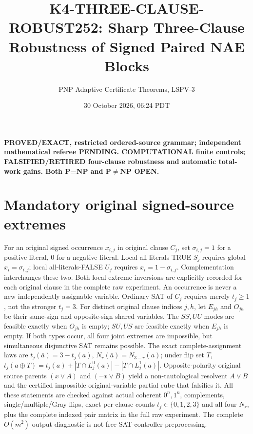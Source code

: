 \documentclass[10pt]{article}
\title{K4-THREE-CLAUSE-ROBUST252: Sharp Three-Clause Robustness of Signed Paired NAE Blocks}
\author{PNP Adaptive Certificate Theorems, LSPV-3}
\date{30 October 2026, 06:24 PDT}
\begin{document}
\maketitle
\noindent\textbf{PROVED/EXACT, restricted ordered-source grammar; independent mathematical referee PENDING. COMPUTATIONAL finite controls; FALSIFIED/RETIRED four-clause robustness and automatic total-work gains. Both P=NP and P$\ne$NP OPEN.}

\section{Mandatory original signed-source extremes}
For an original signed occurrence $x_{i,j}$ in original clause $C_j$, set $\sigma_{i,j}=1$ for a positive literal, $0$ for a negative literal. Local all-literals-TRUE $S_j$ requires global $x_i=\sigma_{i,j}$; local all-literals-FALSE $U_j$ requires $x_i=1-\sigma_{i,j}$. Complementation interchanges these two. Both local extreme inversions are explicitly recorded for each original clause in the complete raw experiment. An occurrence is never a new independently assignable variable. Ordinary SAT of $C_j$ requires merely $t_j\ge1$, not the stronger $t_j=3$.
For distinct original clause indices $j,h$, let $E_{jh}$ and $O_{jh}$ be their same-sign and opposite-sign shared variables. The $SS,UU$ modes are feasible exactly when $O_{jh}$ is empty; $SU,US$ are feasible exactly when $E_{jh}$ is empty. If both types occur, all four joint extremes are impossible, but simultaneous disjunctive SAT remains possible. The exact complete-assignment laws are $t_j(\bar a)=3-t_j(a)$, $N_r(\bar a)=N_{3-r}(a)$; under flip set $T$, $t_j(a\oplus T)=t_j(a)+|T\cap L^0_j(a)|-|T\cap L^1_j(a)|$. Opposite-polarity original source parents $(x\vee A)$ and $(\neg x\vee B)$ yield a non-tautological resolvent $A\vee B$ and the certified impossible original-variable partial cube that falsifies it. All these statements are checked against actual coherent $0^n,1^n$, complements, single/multiple/Gray flips, exact per-clause counts $t_j\in\{0,1,2,3\}$ and all four $N_r$, plus the complete indexed pair matrix in the full raw experiment. The complete $O(m^2)$ output diagnostic is not free SAT-controller preprocessing.
\end{document}
